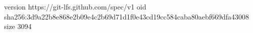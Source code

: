version https://git-lfs.github.com/spec/v1
oid sha256:3d9a22b8e868e2b09e4c2b69d71d1f0e43cd19cc584caba80aebf669dfa43008
size 3094

